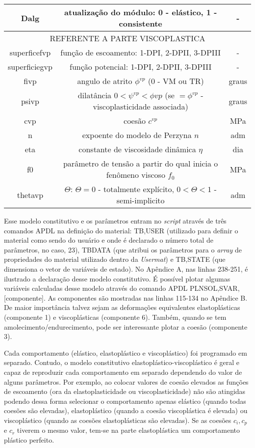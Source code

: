 \begin{table}[H]
\begin{tabular}{c c c}
		Dalg & atualização do módulo: 0 - elástico, 1 - consistente & - \\					
		\hline
		\multicolumn{3}{c}{REFERENTE A PARTE VISCOPLASTICA} \\
		\hline
		superficefvp & função de escoamento: 1-DPI, 2-DPII, 3-DPIII  & - \\
		superficiegvp & função potencial: 1-DPI, 2-DPII, 3-DPIII & - \\
		fivp & angulo de atrito $\phi^{vp}$ (0 - VM ou TR) & graus \\
		psivp & dilatância $0<\psi^{vp}<\phi{vp}$ (se $=\phi^{vp}$ - viscoplasticidade associada) & graus \\
		cvp & coesão $c^{vp}$ & MPa \\
		n & expoente do modelo de Perzyna $n$ & adm \\
		eta & constante de viscosidade dinâmica $\eta$ & dia \\
		f0 & parâmetro de tensão a partir do qual inicia o fenômeno viscoso $f_0$ & MPa \\
		thetavp & $\Theta$: $\Theta=0$ - totalmente explícito, $0<\Theta<1$ - semi-implicito & adm \\
		\hline
	\end{tabular}
	\normalsize
\end{table}

Esse modelo constitutivo e os parâmetros entram no \textit{script} através de três comandos APDL na definição do material: TB,USER (utilizado para definir o material como sendo do usuário e onde é declarado o número total de parâmetros, no caso, 23), TBDATA (que atribui os parâmetros para o \textit{array} de propriedades do material utilizado dentro da \textit{Usermat}) e TB,STATE (que dimensiona o vetor de variáveis de estado). No Apêndice A, nas linhas 238-251, é ilustrado a declaração desse modelo constitutivo. É possível plotar algumas variáveis calculadas desse modelo através do comando APDL PLNSOL,SVAR,[componente]. As componentes são mostradas nas linhas 115-134 no Apêndice B. De maior importância talvez sejam as deformações equivalentes elastoplásticas (componente 1) e viscoplásticas (componente 6). Também, quando se tem amolecimento/endurecimento, pode ser interessante plotar a coesão (componente 3).
 
Cada comportamento (elástico, elastoplástico e viscoplástico) foi programado em separado. Contudo, o modelo constitutivo elastoplástico-viscoplástico é geral e capaz de reproduzir cada comportamento em separado dependendo do valor de alguns parâmetros. Por exemplo, ao colocar valores de coesão elevados as funções de escoamento (ora da elastoplasticidade ou viscoplasticidade) não são atingidas podendo dessa forma selecionar o comportamento apenas elástico (quando todas coesões são elevadas), elastoplástico (quando a coesão viscoplástica é elevada) ou viscoplástico (quando as coesões elastoplásticas são elevadas). Se as coesões $c_i, c_p$ e $c_r$ tiverem o mesmo valor, tem-se na parte elastoplástica um comportamento plástico perfeito.


